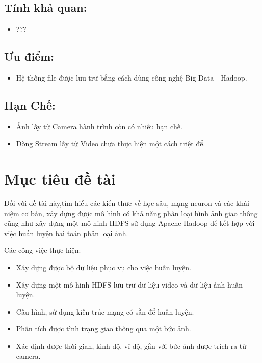 \subsection{Tính khả quan:}
\begin{itemize}
\item ???
\end{itemize}
\subsection{Ưu điểm:}
\begin{itemize}
\item Hệ thống file được lưu trữ bằng cách dùng công nghệ Big Data - Hadoop.
\end{itemize}
\subsection{Hạn Chế:}
\begin{itemize}
\item Ảnh lấy từ Camera hành trình còn có nhiều hạn chế.
\item Dòng Stream lấy từ Video chưa thực hiện một cách triệt để.
\end{itemize}
\section{Mục tiêu đề tài}
Đối với đề tài này,tìm hiểu các kiến thưc về học sâu, mạng neuron và các khái niệm cơ bản, xây dựng được mô hình có khả năng phân loại hình ảnh giao thông cũng như xây dựng một mô hinh HDFS sử dụng Apache Hadoop để kết hợp với việc huấn luyện bai toán phân loại ảnh.\par
Các công việc thực hiện:
\begin{itemize}
	\item Xây dựng được bộ dữ liệu phục vụ cho việc huấn luyện.
	\item Xây dựng một mô hinh HDFS lưu trữ dữ liệu video và dữ liệu ảnh huấn luyện.
	\item Cấu hình, sử dụng kiến trúc mạng có sẵn để huấn luyện.
	\item Phân tích được tình trạng giao thông qua một bức ảnh.
	\item Xác định được thời gian, kinh độ, vĩ độ, gắn với bức ảnh được trích ra từ camera.	
\end{itemize}